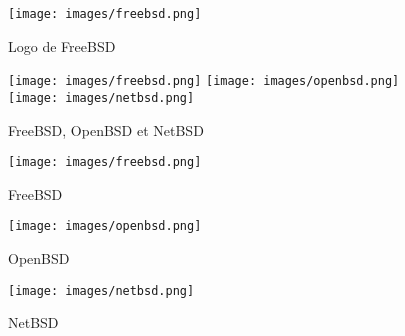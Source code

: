 


\begin{figure}[!h]
\begin{center}
\texttt{[image: images/freebsd.png]}
\caption{\label{freebsd}Logo de FreeBSD}
\end{center}
\end{figure}

\begin{figure}[!h]
   \begin{center}
      \texttt{[image: images/freebsd.png]}
      \hspace{1cm} %
      \texttt{[image: images/openbsd.png]}
      \hspace{1cm}
      \texttt{[image: images/netbsd.png]}
   \end{center}
   \caption{FreeBSD, OpenBSD et NetBSD\protect\footnotemark}
\end{figure}

\begin{figure}[!h]
\begin{minipage}{0.33\textwidth}
   \begin{center}
      \texttt{[image: images/freebsd.png]}
      \caption{FreeBSD}
   \end{center}
\end{minipage}
\begin{minipage}{0.33\textwidth}
   \begin{center}
      \texttt{[image: images/openbsd.png]}
      \caption{OpenBSD}
   \end{center}
\end{minipage}
\begin{minipage}{0.33\textwidth}
   \begin{center}
      \texttt{[image: images/netbsd.png]}
      \caption{NetBSD}
   \end{center}
\end{minipage}
\end{figure}


